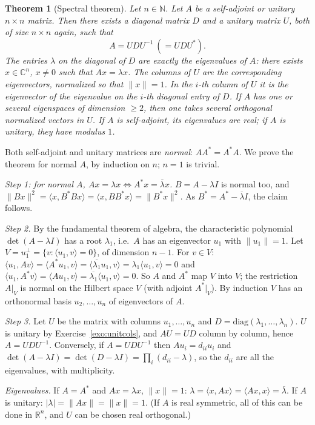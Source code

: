 \documentclass[11pt,a4paper]{article}
\numberwithin{equation}{section}
\newcommand{\N}{\mathbb{N}}
\newcommand{\R}{\mathbb{R}}
\newcommand{\C}{\mathbb{C}}
\newcommand{\ip}[2]{\langle #1, #2\rangle}
\newcommand{\conj}[1]{\overline{#1}}
\theoremstyle{plain}
\newtheorem{theorem}{Theorem}[section]
\theoremstyle{definition}
\theoremstyle{plain}
\theoremstyle{definition}
\begin{document}
\begin{theorem}[Spectral theorem]\label{thm:spectral}
Let $n\in\N$. Let $A$ be a self-adjoint or unitary $n\times n$ matrix. Then there exists a
diagonal matrix $D$ and a unitary matrix $U$, both of size $n\times n$ again, such that
\[
A=UDU^{-1}\ (=UDU^*).
\]
The entries $\lambda$ on the diagonal of $D$ are exactly the eigenvalues of $A$: there
exists $x\in\C^n$, $x\ne0$ such that $Ax=\lambda x$. The columns of $U$ are the
corresponding eigenvectors, normalized so that $\|x\|=1$. In the $i$-th column of $U$ it is
the eigenvector of the eigenvalue on the $i$-th diagonal entry of $D$. If $A$ has one or
several eigenspaces of dimension $\geqslant2$, then one takes several orthogonal normalized
vectors in $U$. If $A$ is self-adjoint, its eigenvalues are real; if $A$ is unitary, they
have modulus $1$.
\end{theorem}

\begin{addition}
Both self-adjoint and unitary matrices are \emph{normal}: $AA^*=A^*A$. We prove the
theorem for normal $A$, by induction on $n$; $n=1$ is trivial.

\emph{Step 1: for normal $A$, $Ax=\lambda x\iff A^*x=\conj\lambda x$.} $B=A-\lambda I$ is
normal too, and $\|Bx\|^2=\ip{x}{B^*Bx}=\ip{x}{BB^*x}=\|B^*x\|^2$. As $B^*=A^*-\conj\lambda I$,
the claim follows.

\emph{Step 2.} By the fundamental theorem of algebra, the characteristic polynomial
$\det(A-\lambda I)$ has a root $\lambda_1$, i.e.\ $A$ has an eigenvector $u_1$ with
$\|u_1\|=1$. Let $V=u_1^\perp=\{v:\ip{u_1}{v}=0\}$, of dimension $n-1$. For $v\in V$:
$\ip{u_1}{Av}=\ip{A^*u_1}{v}=\ip{\conj{\lambda_1}u_1}{v}=\lambda_1\ip{u_1}{v}=0$ and
$\ip{u_1}{A^*v}=\ip{Au_1}{v}=\conj{\lambda_1}\ip{u_1}{v}=0$. So $A$ and $A^*$ map $V$ into
$V$; the restriction $A|_V$ is normal on the Hilbert space $V$ (with adjoint $A^*|_V$). By
induction $V$ has an orthonormal basis $u_2,\dots,u_n$ of eigenvectors of $A$.

\emph{Step 3.} Let $U$ be the matrix with columns $u_1,\dots,u_n$ and
$D=\mathrm{diag}(\lambda_1,\dots,\lambda_n)$. $U$ is unitary by
Exercise~\ref{exo:unitcols}, and $AU=UD$ column by column, hence $A=UDU^{-1}$.
Conversely, if $A=UDU^{-1}$ then $Au_i=d_{ii}u_i$ and
$\det(A-\lambda I)=\det(D-\lambda I)=\prod_i(d_{ii}-\lambda)$, so the $d_{ii}$ are all the
eigenvalues, with multiplicity.

\emph{Eigenvalues.} If $A=A^*$ and $Ax=\lambda x$, $\|x\|=1$:
$\lambda=\ip{x}{Ax}=\ip{Ax}{x}=\conj\lambda$. If $A$ is unitary:
$|\lambda|=\|Ax\|=\|x\|=1$. (If $A$ is real symmetric, all of this can be done in $\R^n$,
and $U$ can be chosen real orthogonal.)
\end{addition}
\end{document}
